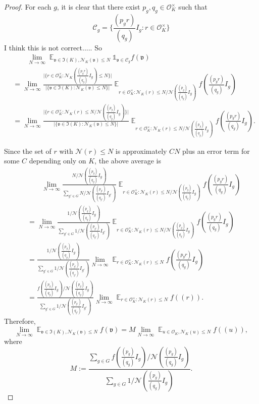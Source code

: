 \documentclass[11pt]{amsart}
\theoremstyle{definition}
\DeclareMathOperator*{\E}{\mathbb{E}}
\newcommand{\NN}{{\mathcal N}}
\begin{document}
\begin{proof}
   For each $g$, it is clear that there exist $p_{g},q_{g}\in\mathcal{O}_{K}^{\times}$ such that 
   $$\mathcal{C}_{g}=\{\frac{(p_{g}r)}{(q_{g})}I_{g}\colon r\in\mathcal{O}_{K}^{\times}\}$$
   {\color{red} I think this is not correct....}. So
   \begin{equation*}
    \begin{split}
        &\qquad\lim_{N\to\infty} \E_{\mathfrak{v}\in \mathfrak{I}(K), \NN_{K}(\mathfrak{v})\leq N}\mathds{1}_{\mathfrak{v}\in \mathcal{C}_{g}}f(\mathfrak{v})
        \\&=\lim_{N\to\infty}\frac{\vert\{r\in\mathcal{O}_{K}^{\times}\colon \NN_{K}(\frac{(p_{g}r)}{(q_{g})}I_{g})\leq N\}\vert}{\vert\{\mathfrak{v}\in \mathfrak{I}(K)\colon \NN_{K}(\mathfrak{v})\leq N\}\vert}\E_{r\in\mathcal{O}_{K}^{\times}\colon \NN_{K}(r)\leq N/\NN(\frac{(p_{g})}{(q_{g})}I_{g})}f(\frac{(p_{g}r)}{(q_{g})}I_{g})
        \\&=\lim_{N\to\infty}\frac{\vert\{r\in\mathcal{O}_{K}^{\times}\colon \NN_{K}(r)\leq N/\NN(\frac{(p_{g})}{(q_{g})}I_{g})\}\vert}{\vert\{\mathfrak{v}\in \mathfrak{I}(K)\colon \NN_{K}(\mathfrak{v})\leq N\}\vert}\E_{r\in\mathcal{O}_{K}^{\times}\colon \NN_{K}(r)\leq N/\NN(\frac{(p_{g})}{(q_{g})}I_{g})}f(\frac{(p_{g}r)}{(q_{g})}I_{g}).
    \end{split}
\end{equation*}

Since the set of $r$ with $\NN(r)\leq N$ is approximately $CN$ plus an error term for some $C$ depending only on $K$, the above average is 
   \begin{equation*}
    \begin{split}
        &\qquad \lim_{N\to\infty}\frac{N/\NN(\frac{(p_{g})}{(q_{g})}I_{g})}{\sum_{g'\in G}N/\NN(\frac{(p_{g'})}{(q_{g'})}I_{g'})}\E_{r\in\mathcal{O}_{K}^{\times}\colon \NN_{K}(r)\leq N/\NN(\frac{(p_{g})}{(q_{g})}I_{g})}f(\frac{(p_{g}r)}{(q_{g})}I_{g})
        \\&=\lim_{N\to\infty}\frac{1/\NN(\frac{(p_{g})}{(q_{g})}I_{g})}{\sum_{g'\in G}1/\NN(\frac{(p_{g'})}{(q_{g'})}I_{g'})}\E_{r\in\mathcal{O}_{K}^{\times}\colon \NN_{K}(r)\leq N/\NN(\frac{(p_{g})}{(q_{g})}I_{g})}f(\frac{(p_{g}r)}{(q_{g})}I_{g})
         \\&=\frac{1/\NN(\frac{(p_{g})}{(q_{g})}I_{g})}{\sum_{g'\in G}1/\NN(\frac{(p_{g'})}{(q_{g'})}I_{g'})}\lim_{N\to\infty}\E_{r\in\mathcal{O}_{K}^{\times}\colon \NN_{K}(r)\leq N}f(\frac{(p_{g}r)}{(q_{g})}I_{g})
          \\&= \frac{f(\frac{(p_{g})}{(q_{g})}I_{g})/\NN(\frac{(p_{g})}{(q_{g})}I_{g})}{\sum_{g'\in G}1/\NN(\frac{(p_{g'})}{(q_{g'})}I_{g'})}\lim_{N\to\infty}\E_{r\in\mathcal{O}_{K}^{\times}\colon \NN_{K}(r)\leq N}f((r)).
    \end{split}
\end{equation*}
Therefore, 
 $$\lim_{N\to\infty} \E_{\mathfrak{v}\in \mathfrak{I}(K), \NN_{K}(\mathfrak{v})\leq N}f(\mathfrak{v})=M\lim_{N\to\infty} \E_{u\in\mathcal{O}_{K}, \NN_{K}(u)\leq N}f((u)),$$
 where 
 $$M:=\frac{\sum_{g\in G}f(\frac{(p_{g})}{(q_{g})}I_{g})/\NN(\frac{(p_{g})}{(q_{g})}I_{g})}{\sum_{g\in G}1/\NN(\frac{(p_{g})}{(q_{g})}I_{g})}.$$


\end{proof}
\end{document}
